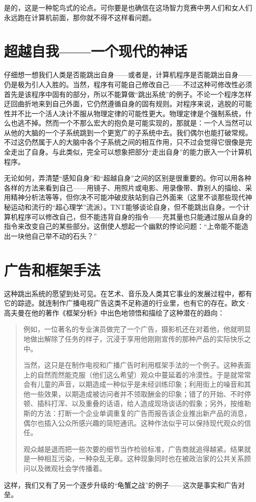 是的，这是一种鸵鸟式的论点。可你要是也确信在这场智力竞赛中男人们和女人们永远跑在计算机前面，那你就不得不这样看问题。

\section{超越自我——一个现代的神话}

仔细想一想我们人类是否能跳出自身——或者是，计算机程序是否能跳出自身——仍是极为引人入胜的。当然，程序有可能自己修改自己——不过这种可修改性必须首先是该程序中固有的部分，所以不能算做“跳出系统”的例子。不论一个程序怎样迂回曲折地来到自己外面，它仍然遵循自身的固有规则。对程序来说，逃脱的可能性并不比一个活人决计不服从物理定律的可能性更大。物理定律是个强制系统，什么也逃不掉。然而一个不那么宏大的抱负是可能实现的，那就是：一个人当然可以从他的大脑的一个子系统跳到一个更宽广的子系统中去。我们偶尔也能打破常规。不过这仍然属于人的大脑中各个子系统之间的相互作用，只不过会觉得它很像是完全走出了自身。与此类似，完全可以想象把部分“走出自身”的能力嵌入一个计算机程序。

无论如何，弄清楚“感知自身”和“超越自身”之间的区别是很重要的。你可以用各种各样的方法来看到自己——用镜子、用照片或电影、用录像带、靠别人的描绘、采用精神分析法等等，但你决不可能冲破皮肤站到自己外面来（这里不谈那些现代神秘运动和流行的“超心理学”流派）。TNT能够谈论自身，但不能跳出自身。一个计算机程序可以修改自己，但不能违背自身的指令——充其量也只能通过服从自身的指令来改变自己的某些部分。这倒使人想起一个幽默的悖论问题：“上帝能不能造出一块他自己举不动的石头？”

\section{广告和框架手法}

这种跳出系统的愿望到处可见。在艺术、音乐及人类其它事业的发展过程中，都有它的踪迹。就连制作广播电视广告这类不足称道的行业里，也有它的存在。欧文·高夫曼在他的著作《框架分析》中出色地领悟和描绘了这种潜在的趋向：

\begin{quote}
例如，一位著名的专业演员做完了一个广告，摄影机还在对着他，他就明显地做出解除了任务的样子，沉浸于享用他刚刚宣传的那种产品的实际快乐之中。

当然，这只是在制作电视和广播广告时利用框架手法的一个例子。这种表面上的自然而然能克服（他们这么希望）观众中蔓延着的冷漠性。于是就常常会有儿童的声音，以期造成一种似乎是未经训练印象；利用街上的噪音和其他一些效果，以期造成被访问者并不领取酬金的印象；错了的开始、不时停顿、插科打浑、以及重叠的话语，给人造成现场谈话的假象；另外，按维勒斯的方法：打断一个企业单调重复的广告而报告该企业推出新产品的消息，偶尔也插入公众所感兴趣的简短通讯。这种作法似乎可以保持现代观众的信任。

观众越是退而把一些次要的细节当作检验标准，广告商就追得越紧。结果就是一种相互污染，一种杂乱无章。这种现象同时也在被政治家的公共关系顾问以及微观社会学传播着。
\end{quote}
这样，我们又有了另一个逐步升级的“龟蟹之战”的例子——这次是事实和广告对垒。

